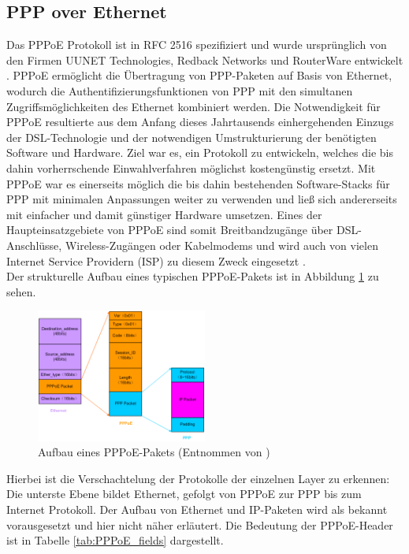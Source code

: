 \documentclass[journal,11pt]{IEEEtran}
\begin{document}
\subsection{PPP over Ethernet}
Das PPPoE Protokoll ist in RFC 2516 spezifiziert und wurde ursprünglich
von den Firmen UUNET Technologies, Redback Networks und RouterWare entwickelt \cite{RFC2516}.
PPPoE ermöglicht die Übertragung von PPP-Paketen auf Basis von Ethernet, wodurch
die Authentifizierungsfunktionen von PPP mit den
simultanen Zugriffsmöglichkeiten des Ethernet kombiniert werden.
Die Notwendigkeit für PPPoE resultierte aus dem Anfang dieses Jahrtausends
einhergehenden Einzugs der DSL-Technologie und der notwendigen Umstrukturierung
der benötigten Software und Hardware. Ziel war es, ein Protokoll zu entwickeln,
welches die bis dahin vorherrschende Einwahlverfahren möglichst kostengünstig
ersetzt. Mit PPPoE war es einerseits möglich die bis dahin bestehenden Software-Stacks für PPP
mit minimalen Anpassungen weiter zu verwenden und ließ sich andererseits mit einfacher
und damit günstiger Hardware umsetzen\cite{dslapp}.
Eines der Haupteinsatzgebiete von PPPoE sind somit Breitbandzugänge über DSL-Anschlüsse,
Wireless-Zugängen oder Kabelmodems und wird
auch von vielen Internet Service Providern (ISP) zu diesem Zweck eingesetzt \cite[p.88]{cisconut}.\\
%
Der strukturelle Aufbau eines typischen PPPoE-Pakets ist in Abbildung \ref{fig:PPPoE_Bild} zu sehen.
\begin{figure}[h!]
 \centering
  \includegraphics[width=0.5\textwidth]{img/pppoe_aufbau.jpg}
 \caption{Aufbau eines PPPoE-Pakets (Entnommen von \cite{pppoe_h3c})}
 \label{fig:PPPoE_Bild}
\end{figure}
Hierbei ist die Verschachtelung der Protokolle der einzelnen Layer zu erkennen: Die unterste
Ebene bildet Ethernet, gefolgt von PPPoE zur PPP bis zum Internet Protokoll.
Der Aufbau von Ethernet und IP-Paketen wird als bekannt vorausgesetzt und hier nicht näher erläutert.
Die Bedeutung der PPPoE-Header ist in Tabelle \ref{tab:PPPoE_fields} dargestellt.
\end{document}
